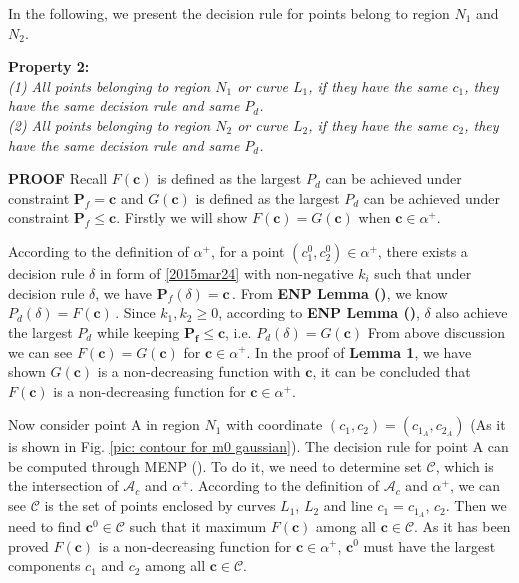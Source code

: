 In the following, we present the decision rule for points belong to region $N_1$ and $N_2$.

\noindent \textbf{Property 2:}
\textit{\\(1) All points belonging to region $N_1$ or curve $L_1$, if they have the same $c_1$, they have the same decision rule and same $P_d$.
\\(2) All points belonging to region $N_2$ or curve $L_2$, if they have the same $c_2$, they have the same decision rule and same $P_d$.
}

\noindent \textbf{PROOF}
Recall $F(\mathbf{c})$ is defined as the largest $P_d$ can be achieved under constraint $\mathbf{P}_f = \mathbf{c}$ and 
       $G(\mathbf{c})$ is defined as the largest $P_d$ can be achieved under constraint $\mathbf{P}_f \leq \mathbf{c}$.
Firstly we will show $F(\mathbf{c}) = G(\mathbf{c}) $ when $\mathbf{c} \in \alpha^+$.

According to the definition of $\alpha^+$, for a point $(c_1^0, c_2^0) \in \alpha^+$, there exists a decision rule $\delta$ in form of \eqref{2015mar24}  with non-negative $k_i$  
such that under decision rule $\delta$, we have 
$\mathbf{P}_{f}(\delta) = \mathbf{c}\,.$
From \textbf{ENP Lemma ()}, we know 
$P_d(\delta) = F(\mathbf{c})\,$.
Since $k_1, k_2 \geq 0$, according to \textbf{ENP Lemma ()}, $\delta$ also achieve the largest $P_d$ while keeping $\mathbf{P_f} \leq \mathbf{c}$, i.e. 
 $P_d(\delta) =G(\mathbf{c}) $
From above discussion  we can see $F(\mathbf{c}) = G(\mathbf{c})$ for $\mathbf{c} \in \alpha^+$.
In the proof of \textbf{Lemma 1},  we have shown $G(\mathbf{c})$ is a non-decreasing function with  $\mathbf{c}$, it can be concluded that $F(\mathbf{c})$ is a non-decreasing function for $\mathbf{c} \in \alpha^+$.

Now consider point A in region ${N}_1$ with coordinate $(c_1, c_2) = (c_{1_A}, c_{2_A})$ (As it is shown in Fig. \ref{pic: contour for m0 gaussian}). The decision rule for point A can be computed through MENP (). To do it,  we need to determine set $\mathcal{C}$, which is the intersection of $\mathcal{A}_c$ and $\alpha^+$. According to the definition of $\mathcal{A}_c$ and $\alpha^+$, we can see $\mathcal{C}$ is the set of points enclosed by curves $L_1$, $L_2$ and line $c_1 = c_{1_A}$, $c_2$. Then we need to find $\mathbf{c}^0 \in \mathcal{C}$ such that it maximum $F(\mathbf{c})$ among all $\mathbf{c} \in \mathcal{C}$. As it has been proved $F(\mathbf{c})$ is a   non-decreasing function for $\mathbf{c} \in \alpha^+$, $\mathbf{c}^0$ must have the largest components $c_1$ and $c_2$ among all $\mathbf{c} \in \mathcal{C}$. 

